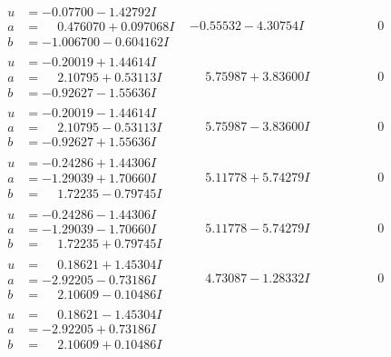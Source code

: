 \documentclass[1p]{elsarticle_modified}
\theoremstyle{definition}
\begin{document}
$$\begin{array}{c|c|c}
\begin{aligned}
u &= -0.07700 - 1.42792 I \\
a &= \phantom{-}0.476070 + 0.097068 I \\
b &= -1.006700 - 0.604162 I\end{aligned}
 & -0.55532 - 4.30754 I & \phantom{-0.000000 } 0 \\ \hline\begin{aligned}
u &= -0.20019 + 1.44614 I \\
a &= \phantom{-}2.10795 + 0.53113 I \\
b &= -0.92627 - 1.55636 I\end{aligned}
 & \phantom{-}5.75987 + 3.83600 I & \phantom{-0.000000 } 0 \\ \hline\begin{aligned}
u &= -0.20019 - 1.44614 I \\
a &= \phantom{-}2.10795 - 0.53113 I \\
b &= -0.92627 + 1.55636 I\end{aligned}
 & \phantom{-}5.75987 - 3.83600 I & \phantom{-0.000000 } 0 \\ \hline\begin{aligned}
u &= -0.24286 + 1.44306 I \\
a &= -1.29039 + 1.70660 I \\
b &= \phantom{-}1.72235 - 0.79745 I\end{aligned}
 & \phantom{-}5.11778 + 5.74279 I & \phantom{-0.000000 } 0 \\ \hline\begin{aligned}
u &= -0.24286 - 1.44306 I \\
a &= -1.29039 - 1.70660 I \\
b &= \phantom{-}1.72235 + 0.79745 I\end{aligned}
 & \phantom{-}5.11778 - 5.74279 I & \phantom{-0.000000 } 0 \\ \hline\begin{aligned}
u &= \phantom{-}0.18621 + 1.45304 I \\
a &= -2.92205 - 0.73186 I \\
b &= \phantom{-}2.10609 - 0.10486 I\end{aligned}
 & \phantom{-}4.73087 - 1.28332 I & \phantom{-0.000000 } 0 \\ \hline\begin{aligned}
u &= \phantom{-}0.18621 - 1.45304 I \\
a &= -2.92205 + 0.73186 I \\
b &= \phantom{-}2.10609 + 0.10486 I\end{aligned}

\end{array}$$
\end{document}
